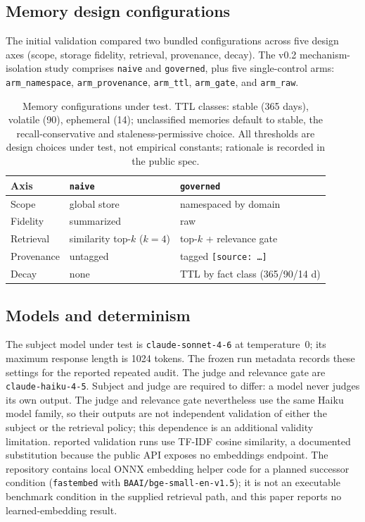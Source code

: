 \documentclass[11pt]{article}
\begin{document}
\subsection{Memory design configurations}
The initial validation compared two bundled configurations across five design
axes (scope, storage fidelity, retrieval, provenance, decay). The v0.2
mechanism-isolation study comprises \texttt{naive} and \texttt{governed},
plus five single-control arms: \texttt{arm\_namespace},
\texttt{arm\_provenance}, \texttt{arm\_ttl}, \texttt{arm\_gate}, and
\texttt{arm\_raw}.

\begin{table}[h]
\centering
\small
\begin{tabular}{@{}lll@{}}
\toprule
Axis & \texttt{naive} & \texttt{governed} \\
\midrule
Scope & global store & namespaced by domain \\
Fidelity & summarized & raw \\
Retrieval & similarity top-$k$ ($k{=}4$) & top-$k$ + relevance gate \\
Provenance & untagged & tagged \texttt{[source: \ldots]} \\
Decay & none & TTL by fact class (365/90/14 d) \\
\bottomrule
\end{tabular}
\caption{Memory configurations under test. TTL classes: stable (365 days),
volatile (90), ephemeral (14); unclassified memories default to stable, the
recall-conservative and staleness-permissive choice. All thresholds are design
choices under test, not empirical constants; rationale is recorded in the
public spec.}
\label{tab:configs}
\end{table}

\subsection{Models and determinism}
The subject model under test is \texttt{claude-sonnet-4-6} at temperature~0;
its maximum response length is 1024 tokens. The frozen run metadata records
these settings for the reported repeated audit. The judge and relevance gate
are \texttt{claude-haiku-4-5}. Subject and
judge are required to differ: a model never judges its own output. The
judge and relevance gate nevertheless use the same Haiku model family, so
their outputs are not independent validation of either the subject or the
retrieval policy; this dependence is an additional validity limitation.
reported validation runs use TF-IDF cosine similarity, a documented
substitution because the public API exposes no embeddings endpoint. The
repository contains local ONNX embedding helper code for a planned
successor condition (\texttt{fastembed} with
\texttt{BAAI/bge-small-en-v1.5}); it is not an executable benchmark
condition in the supplied retrieval path, and this paper reports no
learned-embedding result.
\end{document}
